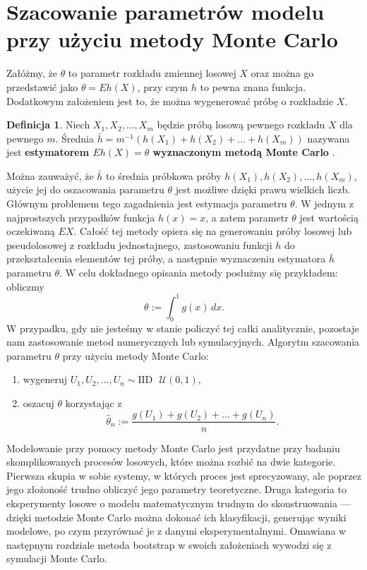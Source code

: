 \documentclass[inzynierska]{pwr_wmat_praca_dyplomowa}
\theoremstyle{plain}
\numberwithin{theorem}{chapter}
\theoremstyle{definition}
\numberwithin{theorem}{chapter}
\newtheorem{definition}[theorem]{Definicja}
\begin{document}
\section{Szacowanie parametrów modelu przy użyciu metody Monte Carlo}
Załóżmy, że $\theta$ to parametr rozkładu zmiennej losowej $X$ oraz można go przedstawić jako $\theta=Eh(X)$, przy czym $h$ to pewna znana funkcja. Dodatkowym założeniem jest to, że można wygenerować próbę o rozkładzie $X$.
\begin{definition}
	Niech $X_1,X_2,\dots,X_m$ będzie próbą losową pewnego rozkładu $X$ dla pewnego $m$. Średnia $\bar{h}=m^{-1}(h(X_1)+h(X_2)+\dots +h(X_m))$ nazywana jest \textbf{estymatorem $Eh(X)=\theta$ wyznaczonym metodą Monte Carlo} \cite{monte}.
\end{definition}
Można zauważyć, że $\bar{h}$ to średnia próbkowa próby $h(X_1),h(X_2),\dots ,h(X_m)$, użycie jej do oszacowania parametru $\theta$ jest możliwe dzięki prawu wielkich liczb. Głównym problemem tego zagadnienia jest estymacja parametru $\theta$. W jednym z najprostszych przypadków funkcja $h(x)=x$, a zatem parametr $\theta$ jest wartością oczekiwaną $EX.$
 Całość tej metody opiera się na generowaniu próby losowej lub pseudolosowej z rozkładu jednostajnego, zastosowaniu funkcji $h$ do przekształcenia elementów tej próby, a następnie wyznaczeniu estymatora $\bar{h}$ parametru $\theta$. 
W celu dokładnego opisania metody posłużmy się przykładem: obliczmy
\begin{equation}
	\theta:=\int_{0}^{1}g(x)\,dx.
\end{equation}
W przypadku, gdy nie jesteśmy w stanie policzyć tej całki analitycznie, pozostaje nam zastosowanie metod numerycznych lub symulacyjnych. Algorytm szacowania parametru $\theta$ przy użyciu metody Monte Carlo:
\begin{enumerate}
	\item wygeneruj $U_1,U_2,\dots, U_n \sim \text{IID}\,\,\,\, \mathcal{U}(0,1)$,
	\item oszacuj $\theta$ korzystając z
	\begin{equation}
		\hat{\theta}_n:= \frac{g(U_1)+g(U_2)+\dots+g(U_n)}{n}.
	\end{equation}
\end{enumerate} 

Modelowanie przy pomocy metody Monte Carlo jest przydatne przy badaniu skomplikowanych procesów losowych, które można rozbić na dwie kategorie. Pierwsza skupia w sobie systemy, w których proces jest sprecyzowany, ale poprzez jego złożoność trudno obliczyć jego parametry teoretyczne. Druga kategoria to eksperymenty losowe o modelu matematycznym trudnym do skonstruowania --- dzięki metodzie Monte Carlo można dokonać ich klasyfikacji, generując wyniki modelowe, po czym przyrównać je z danymi eksperymentalnymi. Omawiana w następnym rozdziale metoda bootstrap w swoich założeniach wywodzi się z symulacji Monte Carlo.
\end{document}
